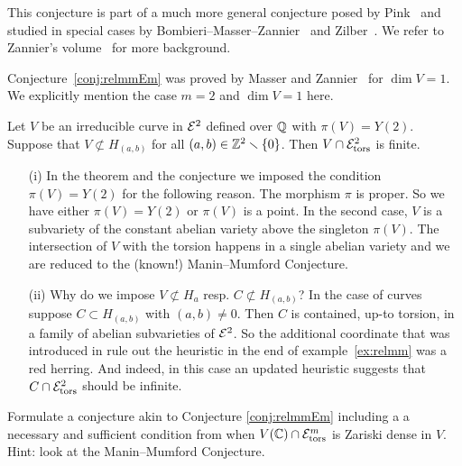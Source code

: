 This conjecture is part of a much more general conjecture posed by
Pink~\cite{Pink} and studied in special cases by
Bombieri--Masser--Zannier~\cite{BMZ,BMZgeometric} and
Zilber~\cite{Zilber}. We refer to Zannier's volume~\cite{ZannierBook}
for more background. 

Conjecture~\ref{conj:relmmEm} was proved by Masser and
Zannier~\cite{MZ:AJM10} for $\dim V = 1$. We explicitly mention the
case $m=2$ and $\dim V=1$ here.

\begin{theorem}
  \label{thm:relmm2}
  Let $V$ be an irreducible curve in ${\mathcal E}^2$ defined over ${\mathbb{Q}}$ with
  $\pi(V)=Y(2)$. Suppose that $V\not\subset H_{(a,b)}$ for all
  $(a,b)\in{\mathbb{Z}}^2\smallsetminus\{0\}$. Then $V\cap {\mathcal E}^2_{\mathrm{tors}}$ is
  finite.
\end{theorem}

\begin{remark}
  \begin{enumerate}
  \item [(i)]In the theorem and the conjecture we imposed the condition
    $\pi(V)=Y(2)$ for the following reason. The morphism $\pi$ is proper.
    So we  have either $\pi(V)=Y(2)$ or $\pi(V)$ is a point. In the second
    case, $V$ is a subvariety of the constant abelian variety above the
    singleton $\pi(V)$. The intersection of $V$ with the torsion happens
    in a single abelian variety and we  are reduced to the (known!)
    Manin--Mumford  Conjecture. 
  \item[(ii)] Why do we impose $V\not\subset H_a$ resp. $C\not\subset
    H_{(a,b)}$? In the case of curves suppose  $C\subset H_{(a,b)}$ with
    $(a,b)\not=0$.
    Then $C$ is contained, up-to torsion, in
    a family of abelian subvarieties of ${\mathcal E}^2$. So the additional
    coordinate that was introduced in rule out the heuristic in the
    end of example~\ref{ex:relmm} was a red herring. And indeed, in this case
    an updated heuristic  suggests that  $C\cap
    {\mathcal E}^2_{\mathrm{tors}}$ should be infinite. 
  \end{enumerate} 
\end{remark}


\begin{exercise} 
  Formulate a conjecture akin to Conjecture \ref{conj:relmmEm} including a
  a necessary and  sufficient condition from when $V({\mathbb{C}})\cap
  \mathcal{E}^m_{\mathrm{tors}}$ is Zariski dense in $V$. Hint: look at
  the Manin--Mumford Conjecture. 
\end{exercise}

